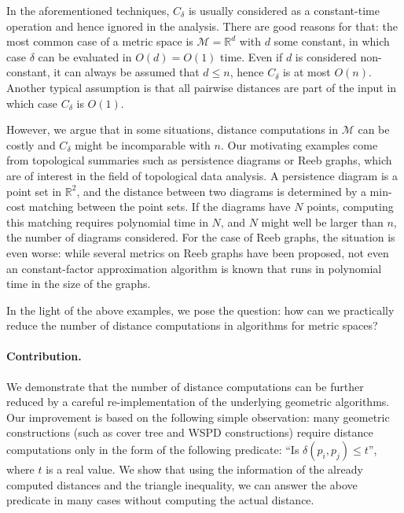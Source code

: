 \documentclass[a4paper,USenglish]{socg-lipics-v2018}
\newcommand{\R}{\mathbb{R}}
\newcommand{\distspace}{\mathcal{M}}
\newcommand{\dist}{\delta}
\newcommand{\complexity}{C_{\dist}}
\begin{document}
In the aforementioned techniques, $\complexity$ is usually considered
as a constant-time operation and hence ignored in the analysis.
There are good reasons for that: the most common case of a metric space
is $\distspace=\R^d$ with $d$ some constant, in which case $\dist$ can be evaluated in $O(d)=O(1)$ time.
Even if $d$ is considered non-constant,
it can always be assumed that $d\leq n$, hence $\complexity$ is at most $O(n)$.
Another typical assumption is that all pairwise distances are part of the input
in which case $\complexity$ is $O(1)$.

However, we argue that in some situations, distance computations
in $\distspace$ can be costly and $\complexity$ might be incomparable
with $n$. Our motivating examples come from topological summaries
such as persistence diagrams or Reeb graphs, which are of interest
in the field of topological data analysis. A persistence diagram
is a point set in $\R^2$, and the distance between two diagrams
is determined by a min-cost matching between the point sets.
If the diagrams have $N$ points, computing this matching requires
polynomial time in $N$, and $N$ might well be larger than $n$, the number
of diagrams considered. For the case of Reeb graphs, the situation is even
worse: while several metrics on Reeb graphs have been proposed,
not even an constant-factor approximation algorithm is known that runs
in polynomial time in the size of the graphs.

In the light of the above examples, we pose the question: 
how can we practically reduce the number of distance computations 
in algorithms for metric spaces?


\paragraph{Contribution.}

%
We demonstrate that the number of distance computations can be further
reduced by a careful re-implementation of the underlying geometric algorithms.
Our improvement is based on the following simple observation: many geometric
constructions (such as cover tree and WSPD constructions) require distance
computations only in the form of the following predicate: 
``Is $\dist(p_i,p_j)\leq t$'', where $t$ is a real value.
We show that using the information of the already computed distances and
the triangle inequality, we can answer the above predicate in many cases
without computing the actual distance.
\end{document}
